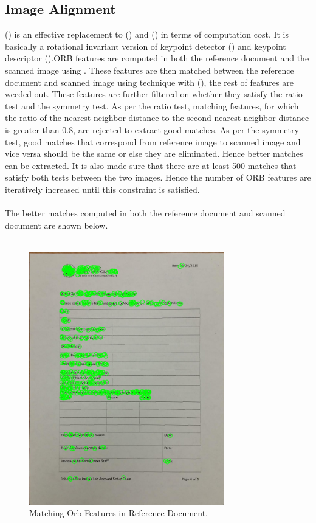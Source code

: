 \subsection{Image Alignment}

 (\cite{Reference3}) is an effective replacement to  (\cite{Reference8}) and  (\cite{Reference9}) in terms of computation cost. It is basically a rotational invariant version of  keypoint detector (\cite{Reference12}) and  keypoint descriptor (\cite{Reference13}).ORB features are computed in both the reference document and the scanned image using  . These features are then matched between the reference document and scanned image using  technique with  (\cite{Reference15}), the rest of features are weeded out. These features are further filtered on whether they satisfy the ratio test and the symmetry test. As per the ratio test, matching features, for which the ratio of the nearest neighbor distance to the second nearest neighbor distance is greater than 0.8, are rejected to extract good matches. As per the symmetry test, good matches that correspond from reference image to scanned image and vice versa should be the same or else they are eliminated. Hence better matches can be extracted. It is also made sure that there are at least 500 matches that satisfy both tests between the two images. Hence the number of ORB features are iteratively increased until this constraint is satisfied. \\ \\
The better matches computed in both the reference document and scanned document are shown below. \\ \\ 
\begin{figure}[th]
	\centering
	\includegraphics[height=11cm ]{Figures/orb_reference_image}
	\caption[Matching Orb Features in Reference Document]{Matching Orb Features in Reference Document.}
	\label{fig:ReferenceDocumentORBFeatures}
\end{figure}

